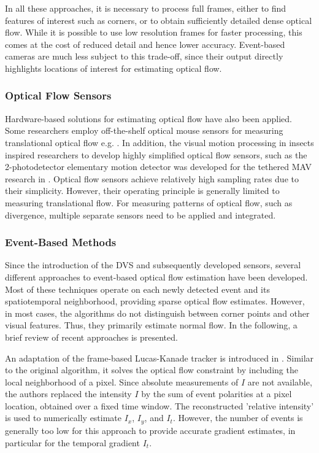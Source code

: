 In all these approaches, it is necessary to process full frames, either to find features of interest such as corners, or to obtain sufficiently detailed dense optical flow. While it is possible to use low resolution frames for faster processing, this comes at the cost of reduced detail and hence lower accuracy. Event-based cameras are much less subject to this trade-off, since their output directly highlights locations of interest for estimating optical flow.

\subsubsection{Optical Flow Sensors}
Hardware-based solutions for estimating optical flow have also been applied. Some researchers employ off-the-shelf optical mouse sensors for measuring translational optical flow e.g. \cite{Zufferey2010}. In addition, the visual motion processing in insects inspired researchers to develop highly simplified optical flow sensors, such as the 2-photodetector elementary motion detector was developed for the tethered MAV research in \cite{Ruffier2005,Ruffier2014}. 
Optical flow sensors achieve relatively high sampling rates due to their simplicity. However, their operating principle is generally limited to measuring translational flow. For measuring patterns of optical flow, such as divergence, multiple separate sensors need to be applied and integrated.

\subsubsection{Event-Based Methods}
Since the introduction of the DVS and subsequently developed sensors, several different approaches to event-based optical flow estimation have been developed. Most of these techniques operate on each newly detected event and its spatiotemporal neighborhood, providing sparse optical flow estimates. However, in most cases, the algorithms do not distinguish between corner points and other visual features. Thus, they primarily estimate normal flow. In the following, a brief review of recent approaches is presented.

An adaptation of the frame-based Lucas-Kanade tracker is introduced in \citet{Benosman2012}. Similar to the original algorithm, it solves the optical flow constraint by including the local neighborhood of a pixel. Since absolute measurements of $I$ are not available, the authors replaced the intensity $I$ by the sum of event polarities at a pixel location, obtained over a fixed time window. The reconstructed 'relative intensity' is used to numerically estimate $I_x$, $I_y$, and $I_t$. However, the number of events is generally too low for this approach to provide accurate gradient estimates, in particular for the temporal gradient $I_t$. 

